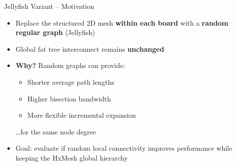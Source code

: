 \documentclass[t]{beamer}
\begin{document}
\begin{frame}{Jellyfish Variant -- Motivation}
    \begin{itemize}
        \item Replace the structured 2D mesh \textbf{within each board} with a \textbf{random regular graph} (Jellyfish)
        \item Global fat tree interconnect remains \textbf{unchanged}

        \vspace{0.3cm}

        \item \textbf{Why?} Random graphs can provide:
        \begin{itemize}
            \item Shorter average path lengths
            \item Higher bisection bandwidth
            \item More flexible incremental expansion
        \end{itemize}
        \ldots for the same node degree

        \vspace{0.3cm}

        \item Goal: evaluate if random local connectivity improves performance while keeping the HxMesh global hierarchy
    \end{itemize}
\end{frame}
\end{document}
